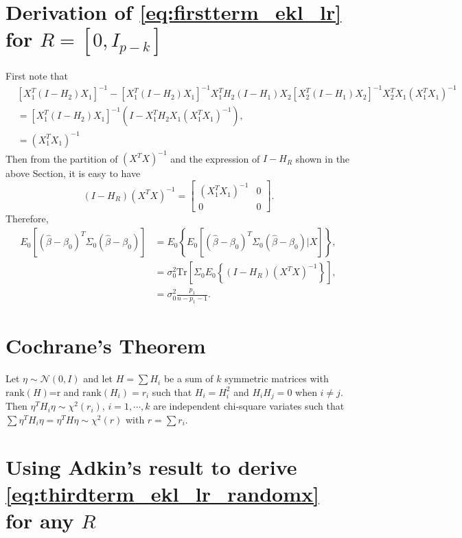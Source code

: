 \section{Derivation of \texorpdfstring{\eqref{eq:firstterm_ekl_lr}}{} for \texorpdfstring{$R=[0, I_{p-k}]$}{}}
First note that
\begin{equation*}
\begin{aligned}
&[X_1^T (I-H_2) X_1 ]^{-1} - [X_1^T (I-H_2) X_1 ]^{-1} X_1^T H_2 (I-H_1) X_2 [X_2^T (I-H_1) X_2 ]^{-1} X_2^T X_1 (X_1^T X_1)^{-1}\\
&= [X_1^T (I-H_2) X_1 ]^{-1} \left( I - X_1^T H_2 X_1 (X_1^T X_1)^{-1} \right),\\
&= (X_1^T X_1)^{-1} 
\end{aligned}
\end{equation*}
Then from the partition of $(X^T X)^{-1}$ and the expression of $I-H_R$ shown in the above Section, it is easy to have
\begin{equation*}
(I-H_R) (X^T X)^{-1} = 
\begin{bmatrix}
(X_1^T X_1)^{-1}  & 0\\
0 & 0
\end{bmatrix}.
\end{equation*}
Therefore,
\begin{equation*}
\begin{aligned}
E_0  \left [ (\hat \beta-\beta_0)^T \Sigma_0 (\hat \beta-\beta_0) \right ] &= E_0 \left\{ E_0 \left [ (\hat \beta-\beta_0)^T \Sigma_0 (\hat \beta-\beta_0) \Big| X \right ]  \right\},\\
&= \sigma_0^2 \text{Tr} \left[ \Sigma_0 E_0 \left\{ (I-H_R) (X^T X)^{-1} \right\} \right], \\
&= \sigma_0^2 \frac{p_1}{n-p_1-1}.
\end{aligned}
\end{equation*}

\section{Cochrane's Theorem}
Let $\eta \sim \mathcal{N}(0, I)$ and let $H=\sum H_i$ be a sum of $k$ symmetric matrices with $\text{rank}(H)$=r and $\text{rank}(H_i)=r_i$ such that $H_i=H_i^2$ and $H_iH_j=0$ when $i \ne j$. Then $\eta^T H_i \eta \sim \chi^2(r_i)$, $i=1,\cdots,k$ are independent chi-square variates such that $\sum \eta^T H_i \eta = \eta^T H \eta \sim \chi^2(r)$ with $r=\sum r_i$.




\section{Using Adkin's result to derive \texorpdfstring{\eqref{eq:thirdterm_ekl_lr_randomx}}{} for any \texorpdfstring{$R$}{}}

